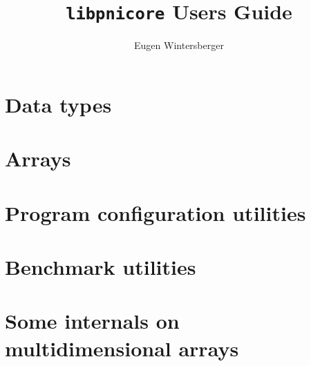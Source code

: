 \documentclass[a4paper]{scrbook}
\title{{\Huge{\tt libpnicore} Users Guide}}
\author{Eugen Wintersberger}
\begin{document}
\maketitle
\tableofcontents

\chapter{Data types}

\FloatBarrier

\chapter{Arrays}

\FloatBarrier

\chapter{Program configuration utilities}
\FloatBarrier

\chapter{Benchmark utilities}
\FloatBarrier

\appendix
\chapter{Some internals on multidimensional arrays}

\FloatBarrier
\end{document}
